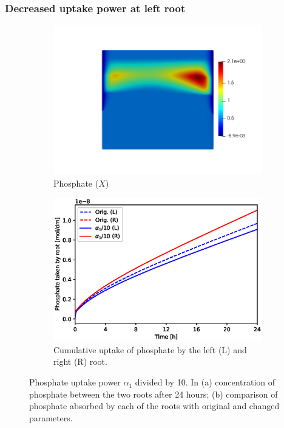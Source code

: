 \documentclass[11pt]{article}
\numberwithin{equation}{section}
\begin{document}
\FloatBarrier
\subsubsection{Decreased uptake power at left root}
\begin{figure}[!htb]
\centering
\begin{subfigure}[t]{0.45\textwidth}
    \includegraphics[trim= 100 100 60 100,width=\textwidth]{Figures/X_alpha1divby10.png}
    \caption{Phosphate ($X$)}
\end{subfigure}
\qquad
\begin{subfigure}[t]{0.45\textwidth}
    \includegraphics[width=\textwidth]{Figures/alpha1divby10.eps}
    \caption{Cumulative uptake of phosphate by the left (L) and right (R) root.}
\end{subfigure}

\caption{Phosphate uptake power $\alpha_1$ divided by 10. In (a) concentration of phosphate between the two roots after 24 hours; (b) comparison of phosphate absorbed by each of the roots with original and changed parameters.}
\end{figure}
\end{document}
